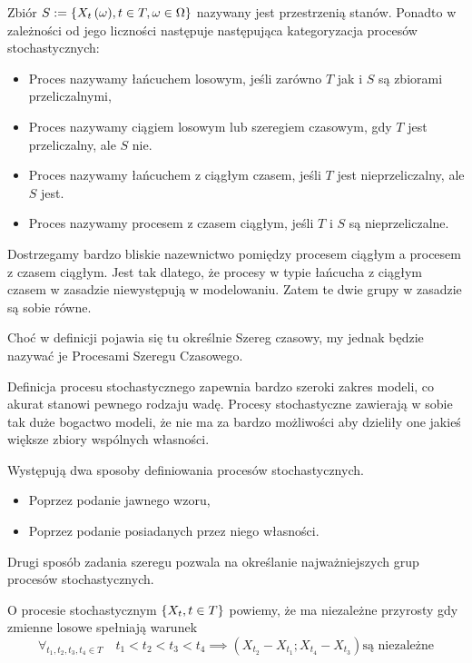 \documentclass[10pt,a4paper]{book}
\begin{document}
\begin{definition}
Zbiór $S := \left\lbrace { {{X_t}\left( {\omega} \right)}, t \in T, \omega \in \Omega } \right\rbrace$ nazywany jest przestrzenią stanów. Ponadto w zależności od jego liczności następuje następująca kategoryzacja procesów stochastycznych:
\begin{itemize}
\item Proces nazywamy łańcuchem losowym, jeśli zarówno $T$ jak i $S$ są zbiorami przeliczalnymi,
\item Proces nazywamy ciągiem losowym lub szeregiem czasowym, gdy $T$ jest przeliczalny, ale $S$ nie.
\item Proces nazywamy łańcuchem z ciągłym czasem, jeśli $T$ jest nieprzeliczalny, ale $S$ jest.
\item Proces nazywamy procesem z czasem ciągłym, jeśli $T$ i $S$ są nieprzeliczalne.
\end{itemize}

\end{definition}

\begin{remark*}
Dostrzegamy bardzo bliskie nazewnictwo pomiędzy procesem ciągłym a procesem z czasem ciągłym. Jest tak dlatego, że procesy w typie łańcucha z ciągłym czasem w zasadzie niewystępują w modelowaniu. Zatem te dwie grupy w zasadzie są sobie równe.
\end{remark*}

\begin{remark*}
Choć w definicji pojawia się tu określnie Szereg czasowy, my jednak będzie nazywać je Procesami Szeregu Czasowego.
\end{remark*}

Definicja procesu stochastycznego zapewnia bardzo szeroki zakres modeli, co akurat stanowi pewnego rodzaju wadę. Procesy stochastyczne zawierają w sobie tak duże bogactwo modeli, że nie ma za bardzo możliwości aby dzieliły one jakieś większe zbiory wspólnych własności. 

Występują dwa sposoby definiowania procesów stochastycznych. 
\begin{itemize}
\item Poprzez podanie jawnego wzoru,
\item Poprzez podanie posiadanych przez niego własności.
\end{itemize}

Drugi sposób zadania szeregu pozwala na określanie najważniejszych grup procesów stochastycznych.

\begin{definition}
O procesie stochastycznym $\left\lbrace {{X_t}, {t \in T}} \right\rbrace$ powiemy, że ma niezależne przyrosty gdy zmienne losowe spełniają warunek 
$$
\forall_{t_1,t_2,t_3,t_4 \in T} \quad t_1 < t_2 <t_3 < t_4 \implies ( X_{t_2} - X_{t_1} ; X_{t_4} - X_{t_3} ) \text{są niezależne}
$$
\end{definition}
\end{document}

